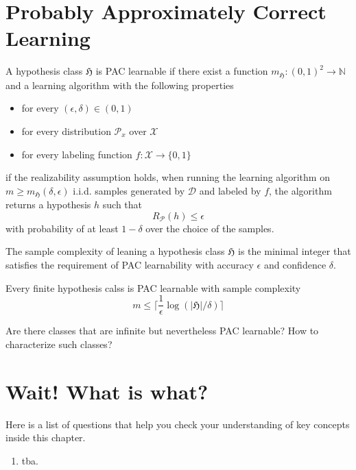 \section{Probably Approximately Correct Learning}
    \begin{definition}
		A hypothesis class $\mathfrak{H}$ is PAC learnable if there exist a
		function $m_\mathfrak{H}: (0,1)^2 \to \mathbb{N}$ and a learning
		algorithm with the following properties
		\begin{itemize}
			\item for every $(\epsilon, \delta) \in (0,1)$
			\item for every distribution $\mathcal{P}_x$ over $\mathcal{X}$
			\item for every labeling function $f: \mathcal{X} \to \{0,1\}$
		\end{itemize}
		if the realizability assumption holds, when running the learning
		algorithm on $m \geq m_\mathfrak{H}(\delta, \epsilon)$ i.i.d. samples
		generated by $\mathcal{D}$ and labeled by $f$, the algorithm returns a
		hypothesis $h$ such that 
		$$
		R_\mathcal{P}(h) \leq \epsilon
		$$ 
		with probability of at least $1-\delta$ over the choice of the samples.
	\end{definition}

    \begin{definition}
		The sample complexity of leaning a hypothesis class $\mathfrak{H}$ is
		the minimal integer that satisfies the requirement of PAC learnability
		with accuracy $\epsilon$ and confidence $\delta$.
	\end{definition}
	\begin{coro}
		Every finite hypothesis calss is PAC learnable with sample complexity 
		$$
		m \leq \lceil \frac{1}{\epsilon} \log(|\mathfrak{H}|/\delta) \rceil
		$$
	\end{coro}
Are there classes that are infinite but nevertheless PAC learnable? How to
characterize such classes?


\section*{Wait! What is what?}
Here is a list of questions that help you check your understanding of key
concepts inside this chapter.

\begin{enumerate}
    \item tba. 
\end{enumerate}

